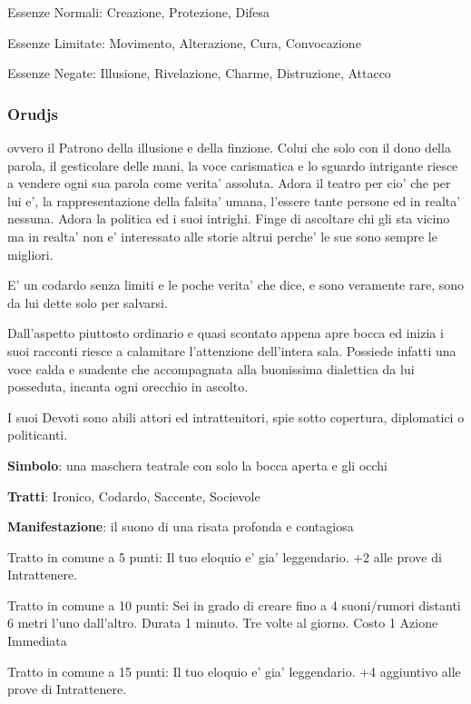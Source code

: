 \documentclass[a4paper,11pt,twoside,openany]{dndbook}
\begin{document}
{Essenze Normali: Creazione, Protezione, Difesa

Essenze Limitate: Movimento, Alterazione, Cura, Convocazione

Essenze Negate: Illusione, Rivelazione, Charme, Distruzione, Attacco

\subsubsection{Orudjs}

\label{orudjs}

ovvero il Patrono della illusione e della finzione. Colui che solo con il dono della parola, il gesticolare delle mani, la voce carismatica e lo sguardo intrigante riesce a vendere ogni sua parola come verita' assoluta. Adora il teatro per cio' che per lui e', la rappresentazione della falsita' umana, l'essere tante persone ed in realta' nessuna. Adora la politica ed i suoi intrighi. Finge di ascoltare chi gli sta vicino ma in realta' non e' interessato alle storie altrui perche' le sue sono sempre le migliori.

E' un codardo senza limiti e le poche verita' che dice, e sono veramente rare, sono da lui dette solo per salvarsi.

Dall'aspetto piuttosto ordinario e quasi scontato appena apre bocca ed inizia i suoi racconti riesce a calamitare l'attenzione dell'intera sala. Possiede infatti una voce calda e suadente che accompagnata alla buonissima dialettica da lui posseduta, incanta ogni orecchio in ascolto.

I suoi Devoti sono abili attori ed intrattenitori, spie sotto copertura, diplomatici o politicanti.

\textbf{Simbolo}: una maschera teatrale con solo la bocca aperta e
gli occhi

\textbf{Tratti}: Ironico, Codardo, Saccente, Socievole

\textbf{Manifestazione}: il suono di una risata profonda e contagiosa

\bigskip

Tratto in comune a 5 punti: Il tuo eloquio e' gia' leggendario. +2 alle prove di Intrattenere.

Tratto in comune a 10 punti: Sei in grado di creare fino a 4 suoni/rumori distanti 6 metri l'uno dall'altro. Durata 1 minuto. Tre volte al giorno. Costo 1 Azione Immediata

Tratto in comune a 15 punti: Il tuo eloquio e' gia' leggendario. +4 aggiuntivo alle prove di Intrattenere.

}
\end{document}
